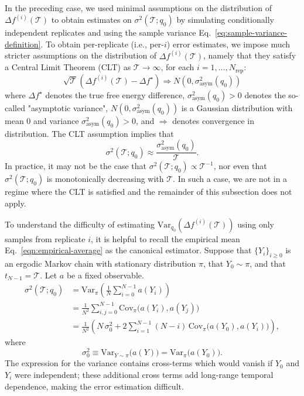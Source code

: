 In the preceding case, we used minimal assumptions on the distribution of $\Delta f^{(i)}(\mathcal{T})$ to obtain estimates on $\sigma^2(\mathcal{T};q_0)$ by simulating conditionally independent replicates and using the sample variance Eq.~\ref{eq:sample-variance-definition}. To obtain per-replicate (i.e., per-$i$) error estimates, we impose much stricter assumptions on the distribution of $\Delta f^{(i)}(\mathcal{T})$,  namely that they satisfy a Central Limit Theorem (CLT) as $\mathcal{T}\rightarrow \infty$, for each $i=1,\dots,N_{\mathrm{rep}}$:
$$ \sqrt{\mathcal{T}} ( \Delta f^{(i)}(\mathcal{T}) - \Delta f^\star) \Rightarrow N(0, \sigma^2_{\mathrm{asym}}(q_0))$$
where $\Delta f^\star$ denotes the true free energy difference, $\sigma_{\mathrm{asym}}^2(q_0)>0$ denotes the so-called "asymptotic variance", $ N(0, \sigma^2_{\mathrm{asym}}(q_0))$ is a Gaussian distribution with mean 0 and variance $\sigma_{\mathrm{asym}}^2(q_0)>0$, and $\Rightarrow$ denotes convergence in distribution. %
The CLT assumption implies that 
$$\sigma^2(\mathcal{T};q_0)\approx\frac{\sigma^2_{\mathrm{asym}}(q_0)}{\mathcal{T}}.$$
In practice, it may not be the case that $\sigma^2(\mathcal{T};q_0)\propto \mathcal{T}^{-1}$, nor even that $\sigma^2(\mathcal{T};q_0)$ is monotonically decreasing with $\mathcal{T}$. In such a case, we are not in a regime where the CLT is satisfied and the remainder of this subsection does not apply.

To understand the difficulty of estimating $\mathrm{Var}_{q_0}(\Delta f^{(i)}(\mathcal{T}))$ using only samples from replicate $i$, it is helpful to recall the empirical mean Eq.~\ref{eqn:empirical-average} as the canonical estimator. Suppose that $\{Y_i\}_{i\ge 0}$ is an ergodic Markov chain with stationary distribution $\pi$, that $Y_0 \sim \pi$, and that $t_{N-1}=\mathcal{T}$. Let $a$ be a fixed observable. 
\begin{align}
\sigma^2(\mathcal{T};q_0) &= \mathrm{Var}_{\pi}\!\left(\frac{1}{N}\sum_{i=0}^{N-1} a(Y_i) \right) \\
&= \frac{1}{N^2}\sum_{i,j=0}^{N-1}
\mathrm{Cov}_{\pi}\!\bigl(a(Y_i), a(Y_j)\bigr) \\
&= \frac{1}{N^2}\left(
N\,\sigma_0^2
+ 2\sum_{i=1}^{N-1} (N-i)\,
\mathrm{Cov}_{\pi}\!\bigl(a(Y_0), a(Y_i)\bigr)
\right),
\label{eqn:variance-of-empirical-mean-long}
\end{align}
where
\[
\sigma_0^2 \equiv \mathrm{Var}_{Y\sim \pi}\!\bigl(a(Y)\bigr)
= \mathrm{Var}_{\pi}\!\bigl(a(Y_0)\bigr).
\]
The expression for the variance contains cross-terms which would vanish if $Y_0$ and $Y_i$ were independent; these additional cross terms add long-range temporal dependence, making the error estimation difficult. 

